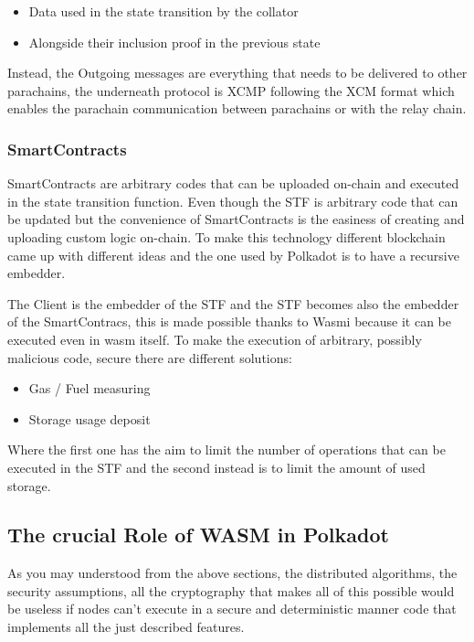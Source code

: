\documentclass[../main.tex]{subfiles}
\begin{document}

\begin{itemize}
  \item Data used in the state transition by the collator
  \item Alongside their inclusion proof in the previous state
\end{itemize}

Instead, the Outgoing messages are everything that needs to be delivered to other parachains, the underneath protocol is XCMP following the XCM format which enables the parachain communication between parachains or with the relay chain.

\subsubsection{SmartContracts}

SmartContracts are arbitrary codes that can be uploaded on-chain and executed in the state transition function. Even though the STF is arbitrary code that can be updated but the convenience of SmartContracts is the easiness of creating and uploading custom logic on-chain. To make this technology different blockchain came up with different ideas and the one used by Polkadot is to have a recursive embedder.

The Client is the embedder of the STF and the STF becomes also the embedder of the SmartContracs, this is made possible thanks to Wasmi because it can be executed even in wasm itself. To make the execution of arbitrary, possibly malicious code, secure there are different solutions:

\begin{itemize}
  \item Gas / Fuel measuring
  \item Storage usage deposit
\end{itemize}

Where the first one has the aim to limit the number of operations that can be executed in the STF and the second instead is to limit the amount of used storage.

\subsection{The crucial Role of WASM in Polkadot}

As you may understood from the above sections, the distributed algorithms, the security assumptions, all the cryptography that makes all of this possible would be useless if nodes can't execute in a secure and deterministic manner code that implements all the just described features.
\end{document}
